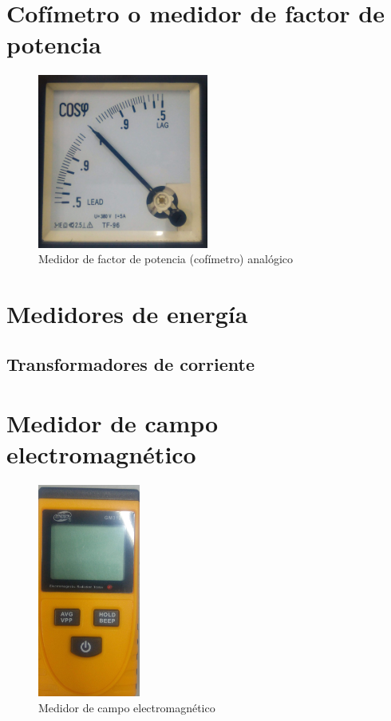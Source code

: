 \section{Cofímetro o medidor de factor de potencia}

\begin{figure}[htbp]
  \centering
  \includegraphics[width=0.5\textwidth,height=\textheight,keepaspectratio]{images/fotos/cofimetro.jpg}
  \caption{Medidor de factor de potencia (cofímetro) analógico}
  \label{fig:cofimetro}
\end{figure}

\section{Medidores de energía}

\subsection{Transformadores de corriente}
\section{Medidor de campo electromagnético}

\begin{figure}[htbp]
  \centering
  \includegraphics[width=0.3\textwidth,height=\textheight,keepaspectratio]{images/fotos/electromagnetico.jpg}
  \caption{Medidor de campo electromagnético}
  \label{fig:medidor_electromagnetico}
\end{figure}

